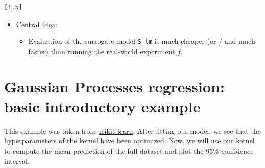 \documentclass[
  letterpaper,
  DIV=11,
  numbers=noendperiod]{scrreprt}
\providecommand{\tightlist}{%
  \setlength{\itemsep}{0pt}\setlength{\parskip}{0pt}}\usepackage{longtable,booktabs,array}
\begin{document}
\begin{verbatim}
[1.5]
\end{verbatim}

\begin{itemize}
\tightlist
\item
  Central Idea:

  \begin{itemize}
  \tightlist
  \item
    Evaluation of the surrogate model \texttt{S\_lm} is much cheaper (or
    / and much faster) than running the real-world experiment \(f\).
  \end{itemize}
\end{itemize}

\hypertarget{gaussian-processes-regression-basic-introductory-example}{%
\section{Gaussian Processes regression: basic introductory
example}\label{gaussian-processes-regression-basic-introductory-example}}

This example was taken from
\href{https://scikit-learn.org/stable/auto_examples/gaussian_process/plot_gpr_noisy_targets.html}{scikit-learn}.
After fitting our model, we see that the hyperparameters of the kernel
have been optimized. Now, we will use our kernel to compute the mean
prediction of the full dataset and plot the 95\% confidence interval.
\end{document}
